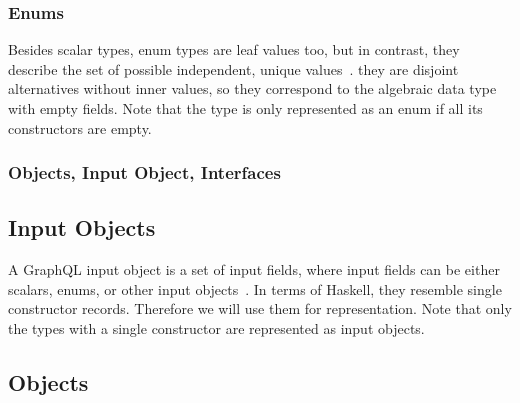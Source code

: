\begin{frame}\frametitle{Enums}

Besides scalar types, enum types are leaf values too, but in contrast, they describe the set of possible independent, unique values~\cite{gql-spec}. they are disjoint alternatives without inner values, so they correspond to the algebraic data type with empty fields. Note that the type is only represented as an enum if all its constructors are empty.


\end{frame}

\begin{frame}\frametitle{Objects, Input Object, Interfaces}

\subsection{Input Objects}

A GraphQL input object is a set of input fields, 
where input fields can be either 
scalars, enums, or other input objects~\cite{gql-spec}. 
In terms of Haskell, they resemble single constructor records. 
Therefore we will use them for representation.  Note that only the types with a single constructor are represented as input objects.


\subsection{Objects}

\end{frame}

